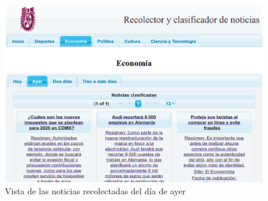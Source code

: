 \begin{figure}[H]
\centering
\includegraphics[scale=0.45]{imagenes/noticiasDeAyer.png}
\caption{Vista de las noticias recolectadas del día de ayer}
\label{fig:vistaNoticiasAyer}
\end{figure}

